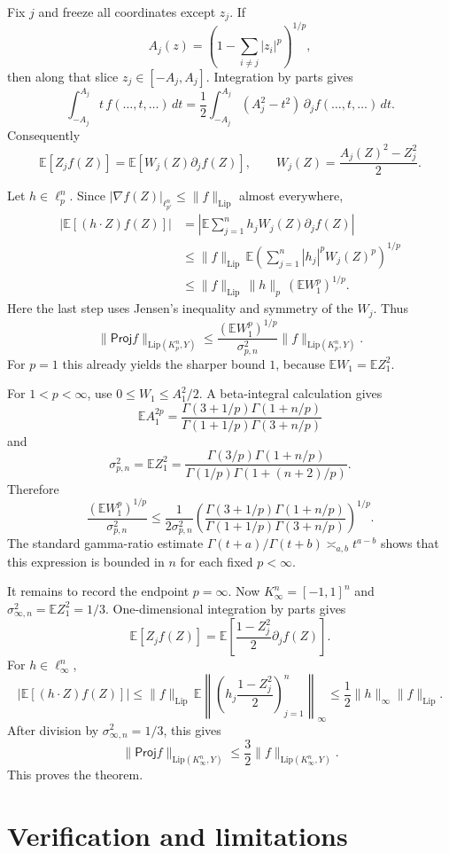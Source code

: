 \documentclass[11pt]{article}
\newcommand{\E}{\mathbb{E}}
\newcommand{\Lip}{\mathrm{Lip}}
\newcommand{\Proj}{\mathsf{Proj}}
\begin{document}
Fix $j$ and freeze all coordinates except $z_j$.  If
\[
A_j(z)=\left(1-\sum_{i\ne j}|z_i|^p\right)^{1/p},
\]
then along that slice $z_j\in[-A_j,A_j]$.  Integration by parts gives
\[
\int_{-A_j}^{A_j} t\, f(\ldots,t,\ldots)\,dt
=\frac12\int_{-A_j}^{A_j}(A_j^2-t^2)\,\partial_j f(\ldots,t,\ldots)\,dt.
\]
Consequently
\[
\E[Z_j f(Z)]=\E[W_j(Z)\partial_j f(Z)],
\qquad
W_j(Z)=\frac{A_j(Z)^2-Z_j^2}{2}.
\]

Let $h\in\ell_p^n$.  Since $|\nabla f(Z)|_{\ell_{p'}^n}\le \|f\|_{\Lip}$ almost everywhere,
\[
\begin{aligned}
\left|\E[(h\cdot Z)f(Z)]\right|
&=\left|\E\sum_{j=1}^n h_j W_j(Z)\partial_j f(Z)\right|\\
&\le \|f\|_{\Lip}\,
\E\left(\sum_{j=1}^n |h_j|^p W_j(Z)^p\right)^{1/p}\\
&\le \|f\|_{\Lip}\,\|h\|_p\,(\E W_1^p)^{1/p}.
\end{aligned}
\]
Here the last step uses Jensen's inequality and symmetry of the $W_j$.
Thus
\[
\|\Proj f\|_{\Lip(K_p^n,Y)}
\le
\frac{(\E W_1^p)^{1/p}}{\sigma_{p,n}^2}\|f\|_{\Lip(K_p^n,Y)}.
\]
For $p=1$ this already yields the sharper bound $1$, because $\E W_1=\E Z_1^2$.

For $1<p<\infty$, use $0\le W_1\le A_1^2/2$.  A beta-integral calculation gives
\[
\E A_1^{2p}
=
\frac{\Gamma(3+1/p)\Gamma(1+n/p)}
{\Gamma(1+1/p)\Gamma(3+n/p)}
\]
and
\[
\sigma_{p,n}^2=\E Z_1^2
=
\frac{\Gamma(3/p)\Gamma(1+n/p)}
{\Gamma(1/p)\Gamma(1+(n+2)/p)}.
\]
Therefore
\[
\frac{(\E W_1^p)^{1/p}}{\sigma_{p,n}^2}
\le
\frac{1}{2\sigma_{p,n}^2}
\left(
\frac{\Gamma(3+1/p)\Gamma(1+n/p)}
{\Gamma(1+1/p)\Gamma(3+n/p)}
\right)^{1/p}.
\]
The standard gamma-ratio estimate $\Gamma(t+a)/\Gamma(t+b)\asymp_{a,b}t^{a-b}$ shows that this expression is bounded in $n$ for each fixed $p<\infty$.

It remains to record the endpoint $p=\infty$.  Now $K_\infty^n=[-1,1]^n$ and $\sigma_{\infty,n}^2=\E Z_1^2=1/3$.  One-dimensional integration by parts gives
\[
\E[Z_j f(Z)]
=\E\left[\frac{1-Z_j^2}{2}\partial_j f(Z)\right].
\]
For $h\in\ell_\infty^n$,
\[
\left|\E[(h\cdot Z)f(Z)]\right|
\le
\|f\|_{\Lip}\,
\E\left\|\left(h_j\frac{1-Z_j^2}{2}\right)_{j=1}^n\right\|_\infty
\le \frac12\|h\|_\infty\|f\|_{\Lip}.
\]
After division by $\sigma_{\infty,n}^2=1/3$, this gives
\[
\|\Proj f\|_{\Lip(K_\infty^n,Y)}\le \frac32\|f\|_{\Lip(K_\infty^n,Y)}.
\]
This proves the theorem.

\section*{Verification and limitations}
\end{document}
